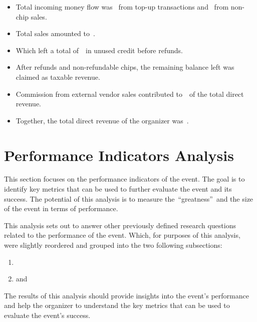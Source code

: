 \begin{keytakeaways}
	\begin{itemize}
		\item Total incoming money flow was~ from top-up transactions and~ from non-chip sales.
		\item Total sales amounted to~.
		\item Which left a total of~~in unused credit before refunds.
		\item After refunds and non-refundable chips, the remaining balance left was~ claimed as taxable revenue.
		\item Commission from external vendor sales contributed to~~of the total direct revenue.
		\item Together, the total direct revenue of the organizer was~.
	\end{itemize}
\end{keytakeaways}



\section{Performance Indicators Analysis}
\label{sec:analysis-performance-indicators}

This section focuses on the performance indicators of the event.
The goal is to identify key metrics that can be used to further evaluate the event and its success.
The potential of this analysis is to measure the~\enquote{greatness}~and the size of the event in terms of performance.

This analysis sets out to answer other previously defined research questions related to the performance of the event.
Which, for purposes of this analysis, were slightly reordered and grouped into the two following subsections:
\begin{enumerate}
	\item {}
	\item and~
\end{enumerate}

The results of this analysis should provide insights into the event's performance and help the organizer to understand the key metrics that can be used to evaluate the event's success.

